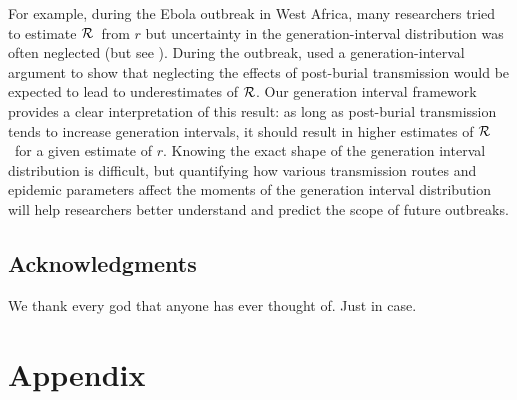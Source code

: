 \documentclass[12pt]{article}
\newcommand{\RR}{\ensuremath{{\cal R}}}
\begin{document}
For example, during the Ebola outbreak in West Africa, many researchers tried to estimate \RR\ from $r$ \cite{Alth14, AylwBarb14, NishChow15, RiveLofg14, 
KingDome15} but uncertainty in the generation-interval distribution was often neglected (but see \cite{TaylDush16}).  
During the outbreak, \cite{WeitDush15} used a generation-interval argument to  show that neglecting the effects of post-burial transmission would be expected to lead to underestimates of \RR.
Our generation interval framework provides a clear interpretation of this result: as long as post-burial transmission tends to increase generation intervals, it should result in higher estimates of \RR\ for a given estimate of $r$.
Knowing the exact shape of the generation interval distribution is difficult, but quantifying how various transmission routes and epidemic parameters affect the moments of the generation interval distribution will help researchers better understand and predict the scope of future outbreaks.

\subsection*{Acknowledgments}

We thank every god that anyone has ever thought of. Just in case.

\printbibliography

\clearpage

\section{Appendix}


\end{document}
